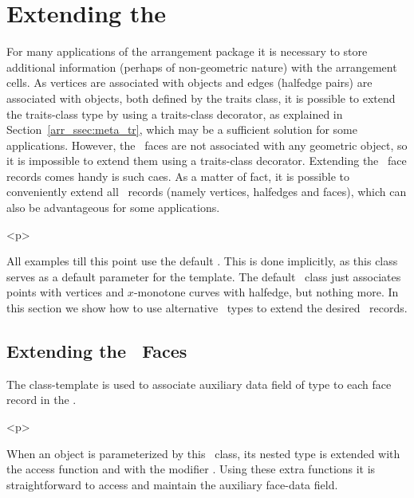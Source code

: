 \section{Extending the \dcel}
\label{arr_sec:ex_dcel}
%
For many applications of the arrangement package it is necessary to
store additional information (perhaps of non-geometric nature) with
the arrangement cells. As vertices are associated with 
objects and edges (halfedge pairs) are associated with
 objects, both defined by the traits class,
it is possible to extend the traits-class type by using a traits-class
decorator, as explained in Section~\ref{arr_ssec:meta_tr}, which may
be a sufficient solution for some applications.
However, the \dcel\ faces are not associated with any geometric object, 
so it is impossible to extend them using a traits-class decorator. 
Extending the \dcel\ face records comes handy is such caes. As a matter
of fact, it is possible to conveniently extend all \dcel\ records
(namely vertices, halfedges and faces), which can also be advantageous
for some applications.

\begin{ccHtmlOnly}<p>\end{ccHtmlOnly}
All examples till this point use the default . 
This is done implicitly, as this class serves as a default parameter for 
the  template. The default \dcel\ class just associates 
points with vertices and $x$-monotone curves with halfedge, but nothing more. 
In this section we show how to use alternative \dcel\ types to extend the 
desired \dcel\ records.

\subsection{Extending the \dcel\ Faces}
\label{arr_ssec:ex_dcel_face}
%
The  class-template
is used to associate auxiliary data field of type  to
each face record in the \dcel.

\begin{ccHtmlOnly}<p>\end{ccHtmlOnly}
When an  object is parameterized by this 
\dcel\ class, its nested  type is extended with the access function
 and with the modifier . Using these extra
functions it is straightforward to access and maintain the auxiliary
face-data field.

